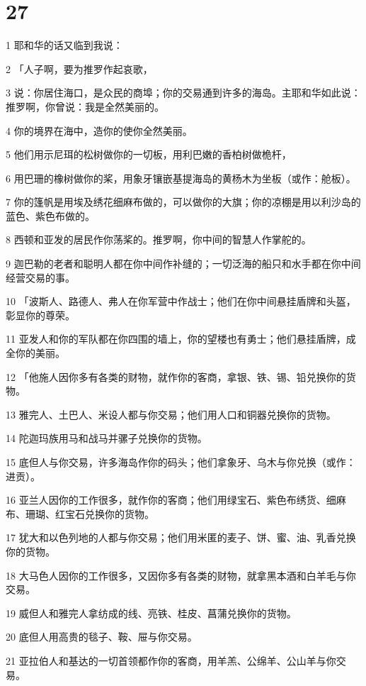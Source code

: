 \chapter{27}

\par 1 耶和华的话又临到我说：
\par 2 「人子啊，要为推罗作起哀歌，
\par 3 说：你居住海口，是众民的商埠；你的交易通到许多的海岛。主耶和华如此说：推罗啊，你曾说：我是全然美丽的。
\par 4 你的境界在海中，造你的使你全然美丽。
\par 5 他们用示尼珥的松树做你的一切板，用利巴嫩的香柏树做桅杆，
\par 6 用巴珊的橡树做你的桨，用象牙镶嵌基提海岛的黄杨木为坐板（或作：舱板）。
\par 7 你的篷帆是用埃及绣花细麻布做的，可以做你的大旗；你的凉棚是用以利沙岛的蓝色、紫色布做的。
\par 8 西顿和亚发的居民作你荡桨的。推罗啊，你中间的智慧人作掌舵的。
\par 9 迦巴勒的老者和聪明人都在你中间作补缝的；一切泛海的船只和水手都在你中间经营交易的事。
\par 10 「波斯人、路德人、弗人在你军营中作战士；他们在你中间悬挂盾牌和头盔，彰显你的尊荣。
\par 11 亚发人和你的军队都在你四围的墙上，你的望楼也有勇士；他们悬挂盾牌，成全你的美丽。
\par 12 「他施人因你多有各类的财物，就作你的客商，拿银、铁、锡、铅兑换你的货物。
\par 13 雅完人、土巴人、米设人都与你交易；他们用人口和铜器兑换你的货物。
\par 14 陀迦玛族用马和战马并骡子兑换你的货物。
\par 15 底但人与你交易，许多海岛作你的码头；他们拿象牙、乌木与你兑换（或作：进贡）。
\par 16 亚兰人因你的工作很多，就作你的客商；他们用绿宝石、紫色布绣货、细麻布、珊瑚、红宝石兑换你的货物。
\par 17 犹大和以色列地的人都与你交易；他们用米匿的麦子、饼、蜜、油、乳香兑换你的货物。
\par 18 大马色人因你的工作很多，又因你多有各类的财物，就拿黑本酒和白羊毛与你交易。
\par 19 威但人和雅完人拿纺成的线、亮铁、桂皮、菖蒲兑换你的货物。
\par 20 底但人用高贵的毯子、鞍、屉与你交易。
\par 21 亚拉伯人和基达的一切首领都作你的客商，用羊羔、公绵羊、公山羊与你交易。
